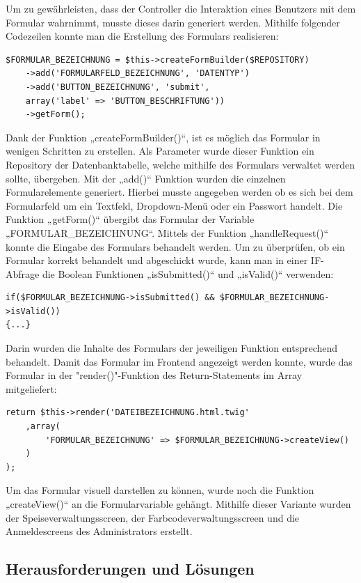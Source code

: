 Um zu gewährleisten, dass der Controller die Interaktion eines Benutzers mit dem Formular wahrnimmt, musste dieses darin generiert werden. Mithilfe folgender Codezeilen konnte man die Erstellung des Formulars realisieren:
	\lstset{language=php}
  	\begin{lstlisting}
$FORMULAR_BEZEICHNUNG = $this->createFormBuilder($REPOSITORY)
	->add('FORMULARFELD_BEZEICHNUNG', 'DATENTYP')
	->add('BUTTON_BEZEICHNUNG', 'submit',
	array('label' => 'BUTTON_BESCHRIFTUNG'))
    ->getForm();
  	\end{lstlisting}
Dank der Funktion „createFormBuilder()“, ist es möglich das Formular in wenigen Schritten zu erstellen. Als Parameter wurde dieser Funktion ein Repository der Datenbanktabelle, welche mithilfe des Formulars verwaltet werden sollte, übergeben. Mit der „add()“ Funktion wurden die einzelnen Formularelemente generiert. Hierbei musste angegeben werden ob es sich bei dem Formularfeld um ein Textfeld, Dropdown-Menü oder ein Passwort handelt. Die Funktion „getForm()“ übergibt das Formular der Variable „FORMULAR\_BEZEICHNUNG“.
Mittels der Funktion „handleRequest()“ konnte die Eingabe des Formulars behandelt werden. Um zu überprüfen, ob ein Formular korrekt behandelt und abgeschickt wurde, kann man in einer IF-Abfrage die Boolean Funktionen „isSubmitted()“ und „isValid()“ verwenden:
	\lstset{language=php}
  	\begin{lstlisting}
if($FORMULAR_BEZEICHNUNG->isSubmitted() && $FORMULAR_BEZEICHNUNG->isValid())
{...}
  	\end{lstlisting}
Darin wurden die Inhalte des Formulars der jeweiligen Funktion entsprechend behandelt.
Damit das Formular im Frontend angezeigt werden konnte, wurde das Formular in der "render()"-Funktion des Return-Statements im Array mitgeliefert:
	\lstset{language=php}
  	\begin{lstlisting}
return $this->render('DATEIBEZEICHNUNG.html.twig'
    ,array(
    	'FORMULAR_BEZEICHNUNG' => $FORMULAR_BEZEICHNUNG->createView()
    )
);
  	\end{lstlisting}
Um das Formular visuell darstellen zu können, wurde noch die Funktion „createView()“ an die Formularvariable gehängt.
Mithilfe dieser Variante wurden der Speiseverwaltungsscreen, der Farbcodeverwaltungsscreen und die Anmeldescreens des Administrators erstellt.

  \subsection{Herausforderungen und Lösungen}

